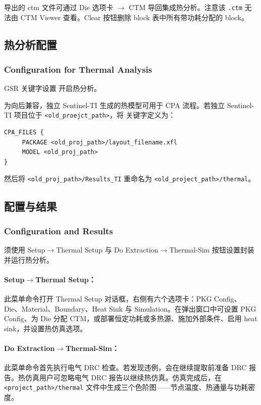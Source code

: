 \label{fig:rh-multi-heat}

导出的 ctm 文件可通过 Die 选项卡 $\rightarrow$ CTM 导回集成热分析。注意该 \texttt{.ctm} 无法由 CTM Viewer 查看。Clear 按钮删除 block 表中所有带功耗分配的 block。

\subsection{热分析配置}
\subsubsection*{Configuration for Thermal Analysis}

GSR 关键字设置  开启热分析。

为向后兼容，独立 Sentinel-TI 生成的热模型可用于 CPA 流程。若独立 Sentinel-TI 项目位于 \texttt{<old\_proejct\_path>}，将  关键字定义为：
\begin{lstlisting}
CPA_FILES {
     PACKAGE <old_proj_path>/layout_filename.xfl
     MODEL <old_proj_path>
}
\end{lstlisting}
然后将 \texttt{<old\_proj\_path>/Results\_TI} 重命名为 \texttt{<old\_project\_path>/thermal}。

\subsection{配置与结果}
\subsubsection*{Configuration and Results}

须使用 Setup$\rightarrow$Thermal Setup 与 Do Extraction$\rightarrow$Thermal-Sim 按钮设置封装并运行热分析。

\label{fig:rh-thermal-buttons}

\paragraph{Setup$\rightarrow$Thermal Setup：}
此菜单命令打开 Thermal Setup 对话框，右侧有六个选项卡：PKG Config、Die、Material、Boundary、Heat Sink 与 Simulation。在弹出窗口中可设置 PKG Config、为 Die 分配 CTM，或部署恒定功耗或多热源、施加外部条件、启用 heat sink，并设置热仿真选项。

\paragraph{Do Extraction$\rightarrow$Thermal-Sim：}
此菜单命令首先执行电气 DRC 检查。若发现违例，会在继续提取前准备 DRC 报告。热仿真用户可忽略电气 DRC 报告以继续热仿真。仿真完成后，在 \texttt{<project\_path>/thermal} 文件中生成三个色阶图——节点温度、热通量与功耗密度。

